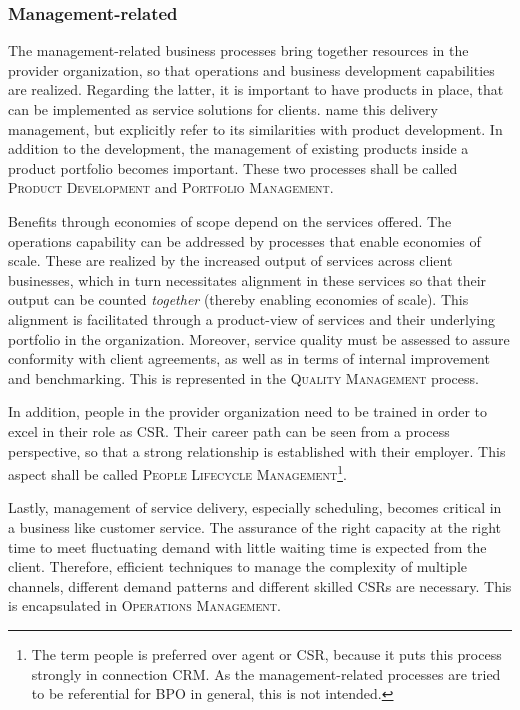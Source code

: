 	\subsubsection{Management-related}
	The management-related business processes bring together resources in the provider organization, so that  operations and business development capabilities are realized. Regarding the latter, it is important to have  products in place, that can be implemented as service solutions for clients. \cite{schewe2007} name this delivery management, but explicitly refer to its similarities with product development. In addition to the development, the management of existing products inside a product portfolio becomes important. These two processes shall be called \textsc{Product Development} and \textsc{Portfolio Management}.
	
	Benefits through economies of scope depend on the services offered. The operations capability can be addressed by processes that enable economies of scale. These are realized by the increased output of services across client businesses, which in turn necessitates alignment in these services so that their output can be counted \textit{together} (\eg thereby enabling economies of scale). This alignment is facilitated through a product-view of services and their underlying portfolio in the organization. Moreover, service quality must be assessed to assure conformity with client agreements, as well as in terms of internal improvement and benchmarking. This is represented in the \textsc{Quality Management} process. 
	
	In addition, people in the provider organization need to be trained in order to excel in their role as \acrshort{CSR}. Their career path can be seen from a process perspective, so that a strong relationship is established with their employer. This aspect shall be called \textsc{People Lifecycle Management}\footnote{The term people is preferred over agent or \acrshort{CSR}, because it puts this process strongly in connection \acrshort{CRM}. As the management-related processes are tried to be referential for \acrshort{BPO} in general, this is not intended.}. 
	
	Lastly, management of service delivery, especially scheduling, becomes critical in a business like customer service. The assurance of the right capacity at the right time to meet fluctuating demand with little waiting time is expected from the client. Therefore, efficient techniques to manage the complexity of multiple channels, different demand patterns and different skilled \acrshort{CSR}s are necessary. This is encapsulated in  \textsc{Operations Management}. 
	
